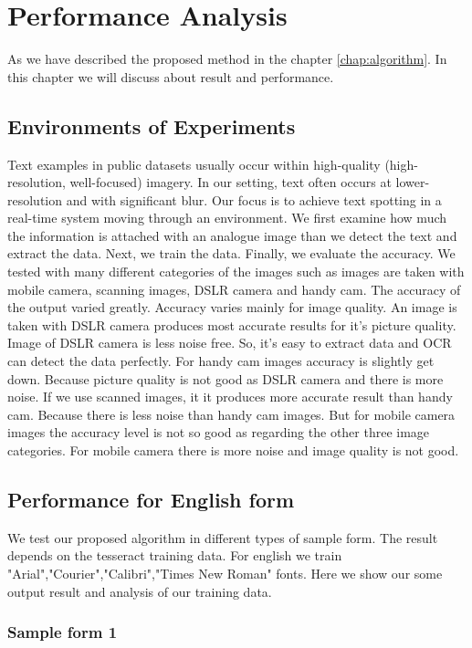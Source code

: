 \chapter {Performance Analysis}
\label{chap:result}
As we have described the proposed method in the chapter \ref{chap:algorithm}. In this chapter we will discuss about result and performance.
\section{Environments of Experiments}
Text examples in public datasets usually occur within high-quality (high-resolution, well-focused) imagery. In our setting, text often occurs at lower-resolution and with significant blur. Our focus is to achieve text spotting in a real-time system moving through an environment. We first examine how much the information is attached with an analogue image than we detect the text and extract the data. Next, we train the data. Finally, we evaluate the accuracy.
We tested with many different categories of the images such as images are taken with mobile camera, scanning images, DSLR camera and handy cam. The accuracy of the output varied greatly. Accuracy varies mainly for image quality. An image is taken with DSLR camera produces most accurate results for it's picture quality. Image of DSLR camera is less noise free. So, it’s easy to extract data and OCR can detect the data perfectly. For handy cam images accuracy is slightly get down. Because picture quality is not good as DSLR camera and there is more noise.
If we use scanned images, it it produces more accurate result than handy cam. Because there is less noise than handy cam images. But for mobile camera images the accuracy level is not so good as regarding the other three image categories. For mobile camera there is more noise and image quality is not good.   

\section{Performance for English form}
We test our proposed algorithm in different types of sample form. The result depends on the tesseract training data. For english we train "Arial","Courier","Calibri","Times New Roman" fonts. Here we show our some output result and analysis of our training data.
\subsection{Sample form 1}

